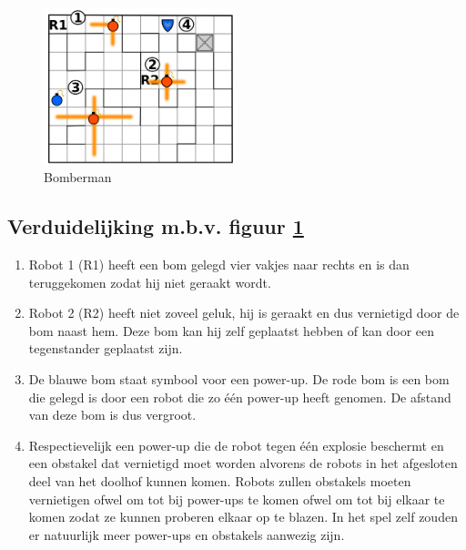 \documentclass[eind]{penoverslag}
\begin{document}
\begin{figure}[h!]
  \centering
    \includegraphics[width=0.5\textwidth]{bomberman}
    \caption{Bomberman}
  \label{fig:bomberman}
\end{figure}

\subsection{Verduidelijking m.b.v. figuur \ref{fig:bomberman}}
\begin{enumerate}
\item
Robot 1 (R1) heeft een bom gelegd vier vakjes naar rechts en is dan teruggekomen zodat hij niet geraakt wordt.

\item
Robot 2 (R2) heeft niet zoveel geluk, hij is geraakt en  dus vernietigd door de bom naast hem. Deze bom kan hij zelf geplaatst hebben of kan door een tegenstander geplaatst zijn.

\item
De blauwe bom staat symbool voor een power-up. De rode bom is een bom die gelegd is door een robot die zo \'e\'en power-up heeft genomen. De afstand van deze bom is dus vergroot.

\item
Respectievelijk een power-up die de robot tegen \'e\'en explosie beschermt en een obstakel dat vernietigd moet worden alvorens de robots in het afgesloten deel van het doolhof kunnen komen. Robots zullen obstakels moeten vernietigen ofwel om tot bij power-ups te komen ofwel om tot bij elkaar te komen zodat ze kunnen proberen elkaar op te blazen. In het spel zelf zouden er natuurlijk meer power-ups en obstakels aanwezig zijn.
\end{enumerate}

\newpage
\end{document}
